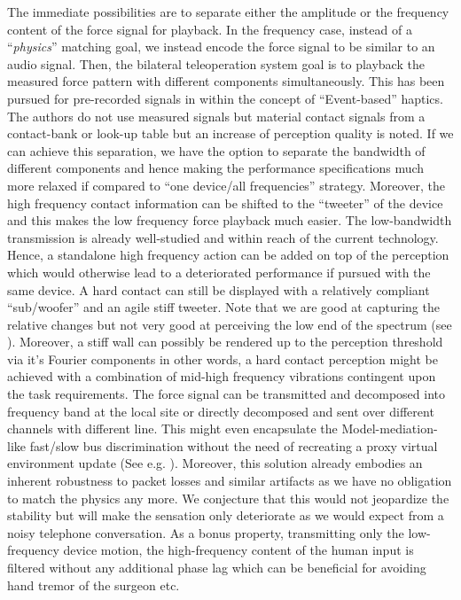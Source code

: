 The immediate possibilities are to separate either the amplitude or the frequency content of the force signal for playback. In the frequency
case, instead of a \enquote{\emph{physics}} matching goal, we instead encode the force signal to be similar to an audio signal. Then, the 
bilateral teleoperation system goal is to playback the measured force pattern with different components simultaneously. This has been pursued for 
pre-recorded signals in \cite{kuchenbecker} within the concept of \enquote{Event-based} haptics. The authors do not use measured 
signals but material contact signals from a contact-bank or look-up table but an increase of perception quality is noted. If we can achieve this separation, 
we have the option to separate the bandwidth of different components and hence making the performance specifications much more 
relaxed if compared to \enquote{one device/all frequencies} strategy. Moreover, the high frequency contact information can be shifted 
to the \enquote{tweeter} of the device and this makes the low frequency force playback much easier. The low-bandwidth transmission is already 
well-studied and within reach of the current technology. Hence, a standalone high frequency action can be added on top of the perception 
which would otherwise lead to a deteriorated performance if pursued with the same device. A hard contact can still be displayed with a 
relatively compliant \enquote{sub/woofer} and an agile stiff tweeter. Note that we are good at capturing the relative changes but not very good at 
perceiving the low end of the spectrum (see ). Moreover, a stiff wall can possibly be rendered up to the perception 
threshold via it's Fourier components in other words, a hard contact perception might be achieved with a combination of mid-high frequency
vibrations contingent upon the task requirements. The force signal can be transmitted and decomposed into frequency band at the local site
or directly decomposed and sent over different channels with different line. This might even encapsulate the Model-mediation-like
fast/slow bus discrimination without the need of recreating a proxy virtual environment update (See e.g. \cite{mitraniemeyer}). Moreover, this 
solution already embodies an inherent robustness to packet losses and similar artifacts as we have no obligation to match the physics any more. 
We conjecture that this would not jeopardize the stability but will make the sensation only deteriorate as we would expect from a noisy telephone 
conversation. As a bonus property, transmitting only the low-frequency device motion, the high-frequency content of the human input is 
filtered without any additional phase lag which can be beneficial for avoiding hand tremor of the surgeon etc. 


